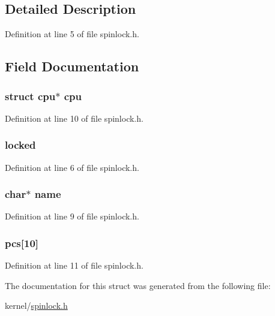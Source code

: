 \subsection{Detailed Description}


Definition at line 5 of file spinlock.\-h.



\subsection{Field Documentation}
\hypertarget{structspinlock_a01255252d6a6f1a4d5550f72dfe3a733}{
\subsubsection[{cpu}]{\setlength{\rightskip}{0pt plus 5cm}struct {\bf cpu}$\ast$ {\bf cpu}}}\label{structspinlock_a01255252d6a6f1a4d5550f72dfe3a733}


Definition at line 10 of file spinlock.\-h.

\hypertarget{structspinlock_a2468e5b98a0b805a0a174eda5d09c6ad}{
\subsubsection[{locked}]{ locked}}\label{structspinlock_a2468e5b98a0b805a0a174eda5d09c6ad}


Definition at line 6 of file spinlock.\-h.

\hypertarget{structspinlock_a5ac083a645d964373f022d03df4849c8}{
\subsubsection[{name}]{\setlength{\rightskip}{0pt plus 5cm}char$\ast$ name}}\label{structspinlock_a5ac083a645d964373f022d03df4849c8}


Definition at line 9 of file spinlock.\-h.

\hypertarget{structspinlock_a96a0f9277e455aac1e0f848607cb1a2d}{
\subsubsection[{pcs}]{ pcs\mbox{[}10\mbox{]}}}\label{structspinlock_a96a0f9277e455aac1e0f848607cb1a2d}


Definition at line 11 of file spinlock.\-h.



The documentation for this struct was generated from the following file\-:\begin{DoxyCompactItemize}
\item 
kernel/\hyperlink{spinlock_8h}{spinlock.\-h}\end{DoxyCompactItemize}
